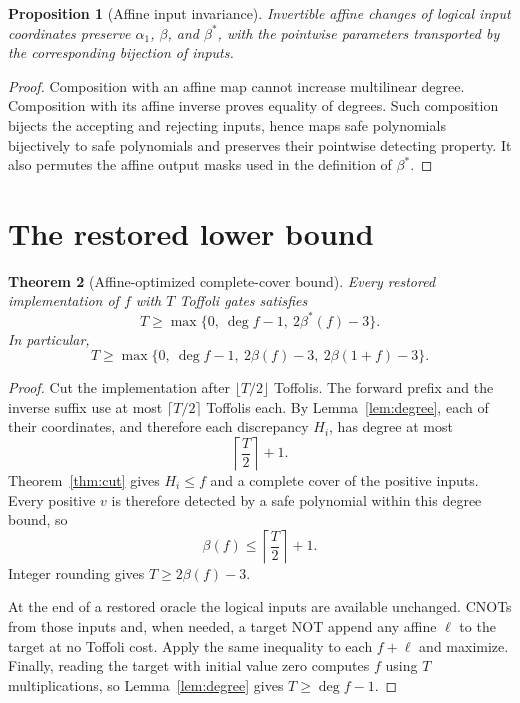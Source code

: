 \documentclass[11pt,letterpaper,oneside]{report}
\theoremstyle{komorebi}
\newtheorem{theorem}{Theorem}[chapter]
\newtheorem{proposition}[theorem]{Proposition}
\begin{document}
\begin{proposition}[Affine input invariance]\label{prop:affine-invariance}
Invertible affine changes of logical input coordinates preserve $\alpha_1$, $\beta$, and $\beta^*$, with the pointwise parameters transported by the corresponding bijection of inputs.
\end{proposition}
\begin{proof}
Composition with an affine map cannot increase multilinear degree. Composition with its affine inverse proves equality of degrees. Such composition bijects the accepting and rejecting inputs, hence maps safe polynomials bijectively to safe polynomials and preserves their pointwise detecting property. It also permutes the affine output masks used in the definition of $\beta^*$.
\end{proof}

\section{The restored lower bound}
\begin{theorem}[Affine-optimized complete-cover bound]\label{thm:complete-bound}
Every restored implementation of $f$ with $T$ Toffoli gates satisfies
\begin{equation}\label{eq:complete-bound}
 T\ge\max\{0,\ \deg f-1,\ 2\beta^*(f)-3\}.
\end{equation}
In particular,
\[
 T\ge\max\{0,\ \deg f-1,\ 2\beta(f)-3,\ 2\beta(1+f)-3\}.
\]
\end{theorem}
\begin{proof}
Cut the implementation after $\lfloor T/2\rfloor$ Toffolis. The forward prefix and the inverse suffix use at most $\lceil T/2\rceil$ Toffolis each. By Lemma~\ref{lem:degree}, each of their coordinates, and therefore each discrepancy $H_i$, has degree at most
\[
 \left\lceil\frac T2\right\rceil+1.
\]
Theorem~\ref{thm:cut} gives $H_i\le f$ and a complete cover of the positive inputs. Every positive $v$ is therefore detected by a safe polynomial within this degree bound, so
\[
 \beta(f)\le\left\lceil\frac T2\right\rceil+1.
\]
Integer rounding gives $T\ge2\beta(f)-3$.

At the end of a restored oracle the logical inputs are available unchanged. CNOTs from those inputs and, when needed, a target NOT append any affine $\ell$ to the target at no Toffoli cost. Apply the same inequality to each $f+\ell$ and maximize. Finally, reading the target with initial value zero computes $f$ using $T$ multiplications, so Lemma~\ref{lem:degree} gives $T\ge\deg f-1$.
\end{proof}
\end{document}
